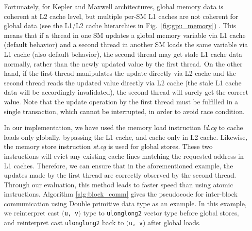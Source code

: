 \documentclass[article]{elsarticle}
\begin{document}
{\begin{algorithm}[!h]
\begin{algorithmic}[1]
 \EndIf
 
 
\EndFunction
\end{algorithmic}

\end{algorithm}

Fortunately, for Kepler and Maxwell architectures, global memory data is coherent at L2 cache level, but multiple per-SM L1 caches are not coherent for global data (see the L1/L2 cache hierarchies in Fig.~\ref{fig:gpu_memory}) \cite{ptxisa43}. This means that if a thread in one SM updates a global memory variable via L1 cache (default behavior) and a second thread in another SM loads the same variable via L1 cache (also default behavior), the second thread may get stale L1 cache data normally, rather than the newly updated value by the first thread. On the other hand, if the first thread manipulates the update directly via L2 cache and the second thread reads the updated value directly via L2 cache (the stale L1 cache data will be accordingly invalidated), the second thread will surely get the correct value. Note that the update operation by the first thread must be fulfilled in a single transaction, which cannot be interrupted, in order to avoid race condition.

In our implementation, we have used the memory load instruction \textit{ld.cg} to cache loads only globally, bypassing the L1 cache, and cache only in L2 cache. Likewise, the memory store instruction \textit{st.cg} is used for global stores. These two instructions will evict any existing cache lines matching the requested address in L1 caches. Therefore, we can ensure that in the aforementioned example, the updates made by the first thread are correctly observed by the second thread. Through our evaluation, this method leads to faster speed than using atomic instructions. Algorithm \ref{alg:block_comm} gives the pseudocode for inter-block communication using Double primitive data type as an example. In this example, we reinterpret cast \hbox{{\tt $($u, v$)$}} type to {\tt ulonglong2} vector type before global stores, and reinterpret cast {\tt ulonglong2} back to \hbox{{\tt $($u, v$)$}} after global loads.

}
\end{document}
